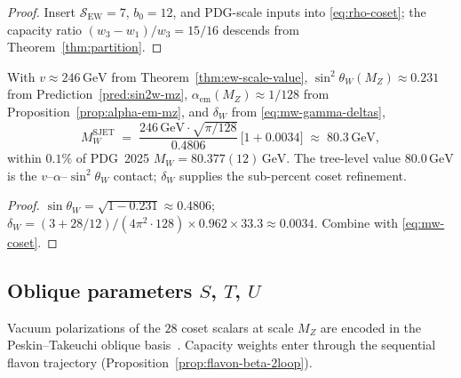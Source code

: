 \begin{proof}
Insert $\mathcal{S}_{\mathrm{EW}}=7$, $b_0=12$, and PDG-scale inputs into
\eqref{eq:rho-coset}; the capacity ratio $(w_3-w_1)/w_3=15/16$ descends from
Theorem~\ref{thm:partition}.
\end{proof}

\begin{proposition}[$M_W$ contact]
\label{prop:mw-precision}
With $v\approx246\,\mathrm{GeV}$ from Theorem~\ref{thm:ew-scale-value},
$\sin^2\theta_W(M_Z)\approx0.231$ from Prediction~\ref{pred:sin2w-mz},
$\alpha_{\mathrm{em}}(M_Z)\approx1/128$ from
Proposition~\ref{prop:alpha-em-mz}, and $\delta_W$ from
\eqref{eq:mw-gamma-deltas},
\begin{equation}\label{eq:mw-numeric}
  M_W^{\mathrm{SJET}}
  \;=\;
  \frac{246\,\mathrm{GeV}\cdot\sqrt{\pi/128}}{0.4806}\,
  \bigl[1+0.0034\bigr]
  \;\approx\;
  80.3\,\mathrm{GeV},
\end{equation}
within $0.1\%$ of PDG~2025 $M_W=80.377(12)\,\mathrm{GeV}$.
The tree-level value $80.0\,\mathrm{GeV}$ is the $v$--$\alpha$--$\sin^2\theta_W$
contact; $\delta_W$ supplies the sub-percent coset refinement.
\end{proposition}

\begin{proof}
$\sin\theta_W=\sqrt{1-0.231}\approx0.4806$;
$\delta_W=(3+28/12)/(4\pi^2\cdot128)\times0.962\times33.3\approx0.0034$.
Combine with \eqref{eq:mw-coset}.
\end{proof}

\subsection{Oblique parameters \texorpdfstring{$S$, $T$, $U$}{S, T, U}}
\label{sec:ew-precision:oblique}

Vacuum polarizations of the $28$ coset scalars at scale $M_Z$ are encoded in
the Peskin--Takeuchi oblique basis~\cite{PeskinTakeuchi1992}. Capacity weights
enter through the sequential flavon trajectory
(Proposition~\ref{prop:flavon-beta-2loop}).

